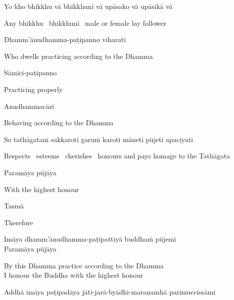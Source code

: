 
Yo kho bhikkhu vā bhikkhunī vā upāsako vā upāsikā vā

\begin{english}
  Any bhikkhu \breathmark\ bhikkhunī \breathmark\ male or female lay follower
\end{english}

Dhamm'ānudhamma-paṭipanno viharati

\begin{english}
  Who dwells practicing according to the Dhamma
\end{english}

Sāmīci-paṭipanno

\begin{english}
  Practicing properly
\end{english}

Anudhammacārī

\begin{english}
  Behaving according to the Dhamma
\end{english}

So tathāgataṁ sakkaroti garuṁ karoti māneti pūjeti apaciyati

\begin{english-hang}
  Respects \breathmark\ esteems \breathmark\ cherishes \breathmark\ honours and pays homage to the Tathāgata
\end{english-hang}

Paramāya pūjāya

\begin{english}
  With the highest honour
\end{english}

\suttaRef{[DN 16]}

Tasmā

\begin{english}
  Therefore
\end{english}

Imāya dhamm'ānudhamma-paṭipattiyā buddhaṁ pūjemi\\
Paramāya pūjāya

\begin{english}
  By this Dhamma practice according to the Dhamma\\
  I honour the Buddha with the highest honour
\end{english}

\begin{pali-hang}
  Addhā imāya paṭipadāya jāti-jarā-byādhi-maraṇamhā parimuccissāmi
\end{pali-hang}

